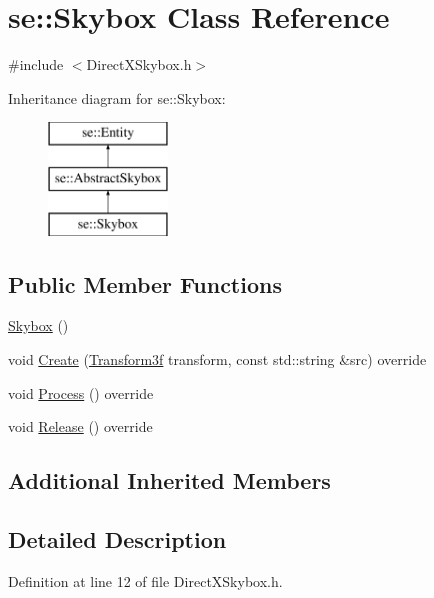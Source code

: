 \hypertarget{classse_1_1_skybox}{}\section{se\+:\+:Skybox Class Reference}
\label{classse_1_1_skybox}


{\ttfamily \#include $<$Direct\+X\+Skybox.\+h$>$}

Inheritance diagram for se\+:\+:Skybox\+:\begin{figure}[H]
\begin{center}
\leavevmode
\includegraphics[height=3.000000cm]{classse_1_1_skybox}
\end{center}
\end{figure}
\subsection*{Public Member Functions}
\begin{DoxyCompactItemize}
\item 
\mbox{\hyperlink{classse_1_1_skybox_a88672cc9288aa769313868aac6646cb7}{Skybox}} ()
\item 
void \mbox{\hyperlink{classse_1_1_skybox_a224bf849fd73b70f59613ebd572fd2ff}{Create}} (\mbox{\hyperlink{classse_1_1_transform3f}{Transform3f}} transform, const std\+::string \&src) override
\item 
void \mbox{\hyperlink{classse_1_1_skybox_acd2b0707c02b2a9ac48bcdd79608801c}{Process}} () override
\item 
void \mbox{\hyperlink{classse_1_1_skybox_ad9a6b80274236240aba6eaafaf7d2e9c}{Release}} () override
\end{DoxyCompactItemize}
\subsection*{Additional Inherited Members}


\subsection{Detailed Description}


Definition at line 12 of file Direct\+X\+Skybox.\+h.



